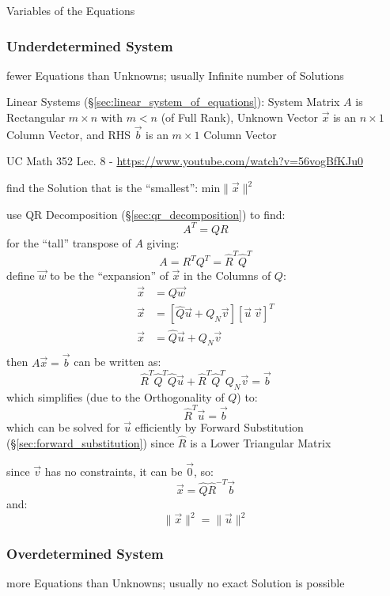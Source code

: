 Variables of the Equations



\subsubsection{Underdetermined System}\label{sec:underdetermined_system}

fewer Equations than Unknowns; usually Infinite number of Solutions

Linear Systems (\S\ref{sec:linear_system_of_equations}): System Matrix $A$ is
Rectangular $m \times n$ with $m < n$ (of Full Rank), Unknown Vector $\vec{x}$
is an $n \times 1$ Column Vector, and RHS $\vec{b}$ is an $m \times 1$ Column
Vector

UC Math 352 Lec. 8 - \url{https://www.youtube.com/watch?v=56vogBfKJu0}

find the Solution that is the ``smallest'': $\mathrm{min}\|\vec{x}\|^2$

use QR Decomposition (\S\ref{sec:qr_decomposition}) to find:
\[
  A^T = QR
\]
for the ``tall'' transpose of $A$ giving:
\[
  A = R^T Q^T = \hat{R}^T \hat{Q}^T
\]
define $\vec{w}$ to be the ``expansion'' of $\vec{x}$ in the Columns of $Q$:
\begin{align*}
  \vec{x} & = Q\vec{w} \\
  \vec{x} & = [\hat{Q}\vec{u} + Q_N\vec{v}] [\vec{u} \ \vec{v}]^T \\
  \vec{x} & = \hat{Q}\vec{u} + Q_N\vec{v} \\
\end{align*}
then $A\vec{x} = \vec{b}$ can be written as:
\[
  \hat{R}^T\hat{Q}^T\hat{Q}\vec{u} + \hat{R}^T\hat{Q}^TQ_N\vec{v} = \vec{b}
\]
which simplifies (due to the Orthogonality of $Q$) to:
\[
  \hat{R}^T\vec{u} = \vec{b}
\]
which can be solved for $\vec{u}$ efficiently by Forward Substitution
(\S\ref{sec:forward_substitution}) since $\hat{R}$ is a Lower Triangular Matrix

since $\vec{v}$ has no constraints, it can be $\vec{0}$, so:
\[
  \vec{x} = \hat{Q}\hat{R}^{-T}\vec{b}
\]
and:
\[
  \|\vec{x}\|^2 = \|\vec{u}\|^2
\]



\subsubsection{Overdetermined System}\label{sec:overdetermined_system}

more Equations than Unknowns; usually no exact Solution is possible

